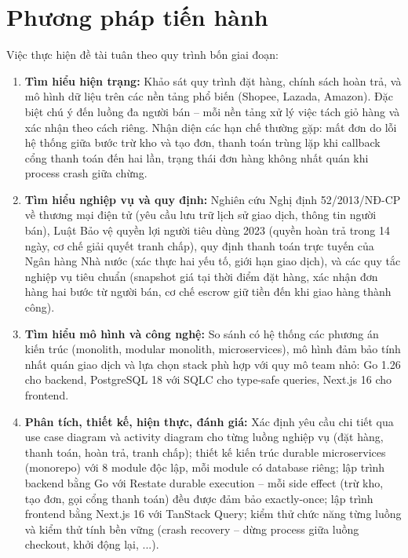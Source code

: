 \section{Phương pháp tiến hành}

Việc thực hiện đề tài tuân theo quy trình bốn giai đoạn:

\begin{enumerate}
    \item \textbf{Tìm hiểu hiện trạng:} Khảo sát quy trình đặt hàng, chính sách hoàn trả, và mô hình dữ liệu trên các nền tảng phổ biến (Shopee, Lazada, Amazon). Đặc biệt chú ý đến luồng đa người bán -- mỗi nền tảng xử lý việc tách giỏ hàng và xác nhận theo cách riêng. Nhận diện các hạn chế thường gặp: mất đơn do lỗi hệ thống giữa bước trừ kho và tạo đơn, thanh toán trùng lặp khi callback cổng thanh toán đến hai lần, trạng thái đơn hàng không nhất quán khi process crash giữa chừng.

    \item \textbf{Tìm hiểu nghiệp vụ và quy định:} Nghiên cứu Nghị định 52/2013/NĐ-CP về thương mại điện tử (yêu cầu lưu trữ lịch sử giao dịch, thông tin người bán), Luật Bảo vệ quyền lợi người tiêu dùng 2023 (quyền hoàn trả trong 14 ngày, cơ chế giải quyết tranh chấp), quy định thanh toán trực tuyến của Ngân hàng Nhà nước (xác thực hai yếu tố, giới hạn giao dịch), và các quy tắc nghiệp vụ tiêu chuẩn (snapshot giá tại thời điểm đặt hàng, xác nhận đơn hàng hai bước từ người bán, cơ chế escrow giữ tiền đến khi giao hàng thành công).

    \item \textbf{Tìm hiểu mô hình và công nghệ:} So sánh có hệ thống các phương án kiến trúc (monolith, modular monolith, microservices), mô hình đảm bảo tính nhất quán giao dịch và lựa chọn stack phù hợp với quy mô team nhỏ: Go 1.26 cho backend, PostgreSQL 18 với SQLC cho type-safe queries, Next.js 16 cho frontend.

    \item \textbf{Phân tích, thiết kế, hiện thực, đánh giá:} Xác định yêu cầu chi tiết qua use case diagram và activity diagram cho từng luồng nghiệp vụ (đặt hàng, thanh toán, hoàn trả, tranh chấp); thiết kế kiến trúc durable microservices (monorepo) với 8 module độc lập, mỗi module có database riêng; lập trình backend bằng Go với Restate durable execution -- mỗi side effect (trừ kho, tạo đơn, gọi cổng thanh toán) đều được đảm bảo exactly-once; lập trình frontend bằng Next.js 16 với TanStack Query; kiểm thử chức năng từng luồng và kiểm thử tính bền vững (crash recovery -- dừng process giữa luồng checkout, khởi động lại, ...).
\end{enumerate}

